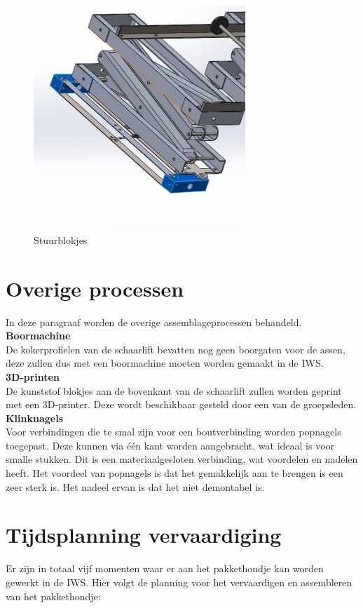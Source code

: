 \begin{figure}[H]
    \includegraphics[width = 80mm]{04_vervaardigingsplan/Stuurblokjes.JPG}
    \caption{Stuurblokjes}
    \label{fig:stuurblokjes}
\end{figure}


\section{Overige processen}
\label{se:Overige_processen}
In deze paragraaf worden de overige assemblageprocessen behandeld.
\\
\textbf{Boormachine}\\
De kokerprofielen van de schaarlift bevatten nog geen boorgaten voor de assen, deze zullen dus met een boormachine moeten worden gemaakt in de IWS.
\\
\textbf{3D-printen}\\
De kunststof blokjes aan de bovenkant van de schaarlift zullen worden geprint met een 3D-printer. Deze wordt beschikbaar gesteld door een van de groepsleden.
\\
\textbf{Klinknagels} \\
Voor verbindingen die te smal zijn voor een boutverbinding worden popnagels toegepast. Deze kunnen via één kant worden aangebracht, wat ideaal is voor smalle stukken. Dit is een materiaalgesloten verbinding, wat voordelen en nadelen heeft. Het voordeel van popnagels is dat het gemakkelijk aan te brengen is een zeer sterk is. Het nadeel ervan is dat het niet demontabel is.

\section{Tijdsplanning vervaardiging}
\label{se:planning_vervaardiging}
Er zijn in totaal vijf momenten waar er aan het pakkethondje kan worden gewerkt in de IWS. Hier volgt de planning voor het vervaardigen en assembleren van het pakkethondje:

